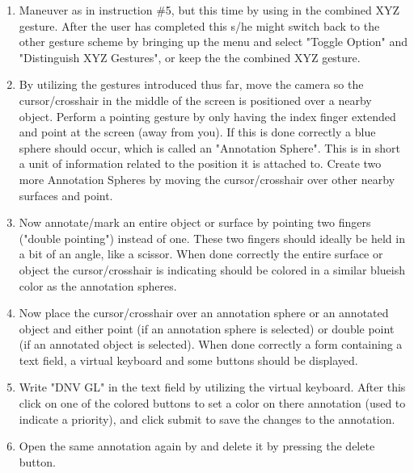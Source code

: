 \begin{enumerate}
    \item Maneuver as in instruction \#5, but this time by using in the combined XYZ gesture. After the user has completed this s/he might switch back to the other gesture scheme
          by bringing up the menu and select "Toggle Option" and "Distinguish XYZ Gestures", or keep the the combined XYZ gesture.

    \item By utilizing the gestures introduced thus far, move the camera so the cursor/crosshair in the middle of the screen is positioned over a nearby object. 
          Perform a pointing gesture by only having the index finger extended and point at the screen (away from you). If this is done correctly a blue sphere should occur, which
          is called an "Annotation Sphere". This is in short a unit of information related to the position it is attached to. Create two more Annotation Spheres by moving the 
          cursor/crosshair over other nearby surfaces and point. 
    
    \item Now annotate/mark an entire object or surface by pointing two fingers ("double pointing") instead of one. These two fingers should ideally be held in a bit of an angle, like a scissor. 
          When done correctly the entire surface or object the cursor/crosshair is indicating should be colored in a similar blueish color as the annotation spheres. 

    \item Now place the cursor/crosshair over an annotation sphere or an annotated object and either point (if an annotation sphere is selected) or double point (if an annotated
          object is selected). When done correctly a form containing a text field, a virtual keyboard and some buttons should be displayed. 

    \item Write "DNV GL" in the text field by utilizing the virtual keyboard. After this click on one of the colored buttons to set a color on there annotation (used to indicate a 
          priority), and click submit to save the changes to the annotation. 

    \item Open the same annotation again by and delete it by pressing the delete button.     
\end{enumerate}

